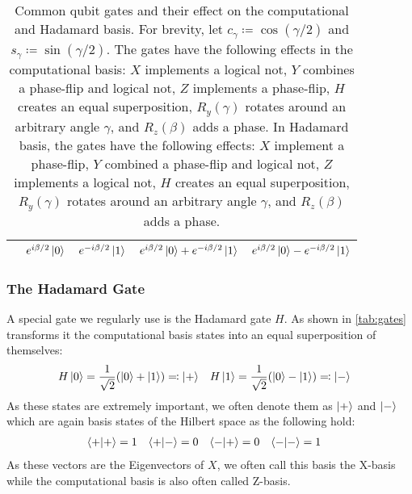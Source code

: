 \begin{table}
\begin{tabular}{l|ll|ll}
					 & \( e^{ i \beta / 2} \ket{0} \)
					 & \( e^{-i \beta / 2} \ket{1} \)
					 & \( e^{ i \beta / 2} \ket{0} + e^{-i \beta / 2} \ket{1} \)
					 & \( e^{ i \beta / 2} \ket{0} - e^{-i \beta / 2} \ket{1} \)
					\\
					\bottomrule
				\end{tabular}
				\caption[Common Single-Qubit Gates]{Common qubit gates and their effect on the computational and Hadamard basis. For brevity, let \( c_\gamma \coloneqq \cos(\gamma / 2) \) and \( s_\gamma \coloneqq \sin(\gamma / 2) \). The gates have the following effects in the computational basis: \(X\) implements a logical not, \(Y\) combines a phase-flip and logical not, \(Z\) implements a phase-flip, \(H\) creates an equal superposition, \(R_y(\gamma)\) rotates around an arbitrary angle \(\gamma\), and \(R_z(\beta)\) adds a phase. In Hadamard basis, the gates have the following effects: \(X\) implement a phase-flip, \(Y\) combined a phase-flip and logical not, \(Z\) implements a logical not, \(H\) creates an equal superposition, \(R_y(\gamma)\) rotates around an arbitrary angle \(\gamma\), and \(R_z(\beta)\) adds a phase.}
				\label{tab:gates}
			\end{table}

			\subsubsection{The Hadamard Gate}
				\label{subsec:hadamardGate}

				A special gate we regularly use is the Hadamard gate \(H\). As shown in \autoref{tab:gates} transforms it the computational basis states into an equal superposition of themselves:
				\begin{align}
					H \ket{0} & = \frac{1}{\sqrt{2}} (\ket{0} + \ket{1}) \eqqcolon \ket{+} &
					H \ket{1} & = \frac{1}{\sqrt{2}} (\ket{0} - \ket{1}) \eqqcolon \ket{-}
					\label{eq:hadamardBasis}
				\end{align}
				As these states are extremely important, we often denote them as \(\ket{+}\) and \(\ket{-}\) which are again basis states of the Hilbert space as the following hold:
				\begin{align}
					\ip{+}{+} & = 1 &
					\ip{+}{-} & = 0 &
					\ip{-}{+} & = 0 &
					\ip{-}{-} & = 1
				\end{align}
				As these vectors are the Eigenvectors of \(X\), we often call this basis the X-basis while the computational basis is also often called Z-basis.

